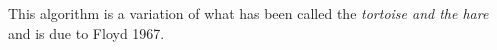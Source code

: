 


This algorithm is a variation of what has been called the
\emph{tortoise and the hare} and is due to Floyd 1967.




